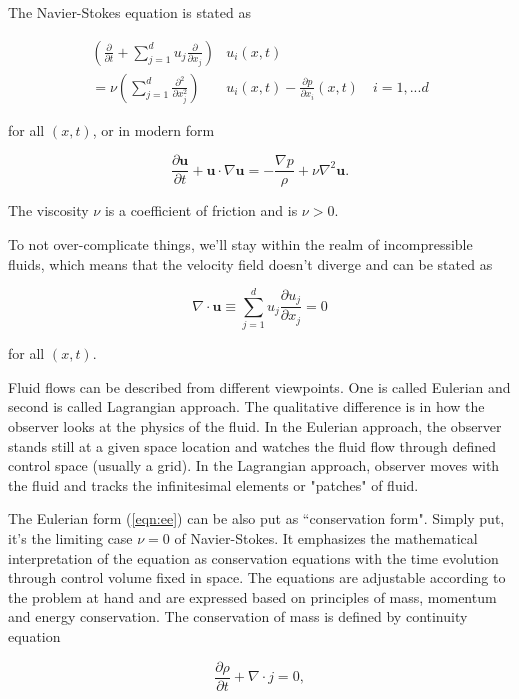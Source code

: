 The Navier-Stokes equation is stated as

\begin{align} 
	\label{eqn:ns}
	\left(\frac{\partial}{\partial t} + \sum_{j=1}^{d} u_j \frac{\partial}{\partial x_j}\right) &u_i(x,t) \\
	 = \nu \left(\sum_{j=1}^{d} \frac{\partial^2}{\partial x_j^2}\right) &u_i(x,t) - \frac{\partial p}{\partial x_i} (x,t) \quad  i = 1,...d
\end{align}

for all $(x, t)$, or in modern form

\begin{equation} 
	\label{eqn:ns-modern}
	\frac{\partial \bm{u}}{\partial t} + \bm{u} \cdot \nabla \bm{u} = - \frac{\nabla p}{\rho} + \nu \nabla^2 \bm{u}.
\end{equation}

The viscosity $\nu$ is a coefficient of friction and is $\nu  > 0$.

To not over-complicate things, we'll stay within the realm of incompressible fluids, which means that the velocity field doesn't diverge and can be stated as

\begin{equation} 
	\label{eqn:div-u}
	\nabla \cdot \bm{u} \equiv \sum_{j=1}^{d} u_j \frac{\partial u_j}{\partial x_j}= 0
\end{equation}

for all $(x, t)$.

Fluid flows can be described from different viewpoints. One is called Eulerian and second is called Lagrangian approach. The qualitative difference is in how the observer looks at the physics of the fluid. In the Eulerian approach, the observer stands still at a given space location and watches the fluid flow through defined control space (usually a grid). In the Lagrangian approach, observer moves with the fluid and tracks the infinitesimal elements or "patches" of fluid.

The Eulerian form (\ref{eqn:ee}) can be also put as ``conservation form". Simply put, it's the limiting case $\nu = 0$ of Navier-Stokes. It emphasizes the mathematical interpretation of the equation as conservation equations with the time evolution through control volume fixed in space. The equations are adjustable according to the problem at hand and are expressed based on principles of mass, momentum and energy conservation. The conservation of mass is defined by continuity equation

\begin{equation}
\frac{\partial \rho}{\partial t} + \nabla \cdot j = 0,
\end{equation}

